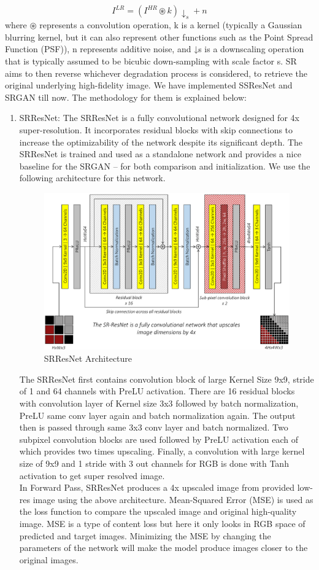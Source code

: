 $$I^{LR}= (I^{HR} \circledast k)\downarrow_s + n$$
where $\circledast$ represents a convolution operation, k is a kernel (typically a Gaussian blurring
kernel, but it can also represent other functions such as the Point Spread Function
(PSF)), n represents additive noise, and ↓s is a downscaling operation that is typically
assumed to be bicubic down-sampling with scale factor s.
SR aims to then reverse whichever degradation process is considered, to retrieve the original underlying high-fidelity image. We have implemented SSResNet and SRGAN till now. The methodology for them is explained below: 
\begin{enumerate}
    \item SRResNet: The SRResNet is a fully convolutional network designed for 4x super-resolution. It incorporates residual blocks with skip connections to increase the optimizability of the network despite its significant depth. The SRResNet is trained and used as a standalone network and provides a nice baseline for the SRGAN – for both comparison and initialization. We use the following architecture for this network.
    \newpage 
    \begin{figure}[ht]
        \centering
        \includegraphics[width=6in]{./figures/srresnet.png}
        \caption{SRResNet Architecture}
    \end{figure} 
    The SRResNet first contains convolution block of large Kernel Size 9x9, stride of 1 and 64 channels with PreLU activation. There are 16 residual blocks with convolution layer of Kernel size 3x3 followed by batch normalization, PreLU same conv layer again and batch normalization again. The output then is passed through same 3x3 conv layer and batch normalized. Two subpixel convolution blocks are used followed by PreLU activation each of which provides two times upscaling. Finally, a convolution with large kernel size of 9x9 and 1 stride with 3 out channels for RGB is done with Tanh activation to get super resolved image.\\ In Forward Pass, SRResNet produces a 4x upscaled image from provided low-res image using the above architecture. Mean-Squared Error (MSE) is used as the loss function to compare the upscaled image and original high-quality image. MSE is a type of content loss but here it only looks in RGB space of predicted and target images. Minimizing the MSE by changing the parameters of the network will make the model produce images closer to the original images.
    

\end{enumerate}
